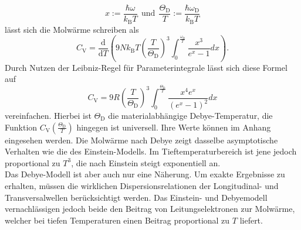 \begin{equation}
  x := \frac{\hbar\omega}{k_{\text{B}}T} \:\: \text{und} \:\: \frac{\Theta_{\text{D}}}{T} := \frac{\hbar\omega_{\text{D}}}{k_{\text{B}}T} \label{eqn:4}
\end{equation}
lässt sich die Molwärme schreiben als
\begin{equation}
  C_{\text{V}} = \frac{\mathrm{d}}{\mathrm{d}T} \left( 9N k_{\text{B}}T \left(\frac{T}{\Theta_{\text{D}}}\right)^3 \int_{0}^{\frac{\omega_{\text{D}}}{T}}\frac{x^3}{e^x-1}dx\right).
\end{equation}
Durch Nutzen der Leibniz-Regel für Parameterintegrale lässt sich diese Formel auf
\begin{equation}
  C_{\text{V}} = 9R \left(\frac{T}{\Theta_{\text{D}}}\right)^3 \int_{0}^{\frac{\Theta_{\text{D}}}{T}} \frac{x^4e^x}{\left(e^x-1\right)^2}dx
\end{equation}
vereinfachen.
Hierbei ist $\Theta_{\text{D}}$ die materialabhängige Debye-Temperatur, die Funktion $C_{\text{V}}\left(\frac{\Theta_{\text{D}}}{T}\right)$ hingegen ist universell.
Ihre Werte können im Anhang eingesehen werden.
Die Molwärme nach Debye zeigt dasselbe asymptotische Verhalten wie die des Einstein-Modells.
Im Tieftemperaturbereich ist jene jedoch proportional zu $T^3$, die nach Einstein steigt exponentiell an.\\
Das Debye-Modell ist aber auch nur eine Näherung.
Um exakte Ergebnisse zu erhalten, müssen die wirklichen Dispersionsrelationen der Longitudinal- und Transversalwellen berücksichtigt werden.
Das Einstein- und Debyemodell vernachlässigen jedoch beide den Beitrag von Leitungselektronen zur Molwärme, welcher bei tiefen Temperaturen einen Beitrag proportional zu $T$ liefert.\cite{skript}
